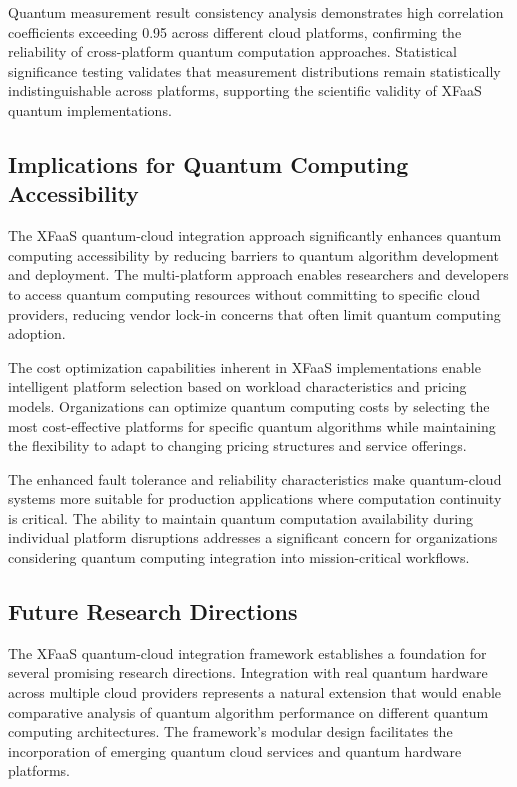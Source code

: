 \documentclass[onecolumn]{IEEEtran}
\begin{document}
Quantum measurement result consistency analysis demonstrates high correlation coefficients exceeding 0.95 across different cloud platforms, confirming the reliability of cross-platform quantum computation approaches. Statistical significance testing validates that measurement distributions remain statistically indistinguishable across platforms, supporting the scientific validity of XFaaS quantum implementations.

\subsection{Implications for Quantum Computing Accessibility}

The XFaaS quantum-cloud integration approach significantly enhances quantum computing accessibility by reducing barriers to quantum algorithm development and deployment. The multi-platform approach enables researchers and developers to access quantum computing resources without committing to specific cloud providers, reducing vendor lock-in concerns that often limit quantum computing adoption.

The cost optimization capabilities inherent in XFaaS implementations enable intelligent platform selection based on workload characteristics and pricing models. Organizations can optimize quantum computing costs by selecting the most cost-effective platforms for specific quantum algorithms while maintaining the flexibility to adapt to changing pricing structures and service offerings.

The enhanced fault tolerance and reliability characteristics make quantum-cloud systems more suitable for production applications where computation continuity is critical. The ability to maintain quantum computation availability during individual platform disruptions addresses a significant concern for organizations considering quantum computing integration into mission-critical workflows.

\subsection{Future Research Directions}

The XFaaS quantum-cloud integration framework establishes a foundation for several promising research directions. Integration with real quantum hardware across multiple cloud providers represents a natural extension that would enable comparative analysis of quantum algorithm performance on different quantum computing architectures. The framework's modular design facilitates the incorporation of emerging quantum cloud services and quantum hardware platforms.
\end{document}
